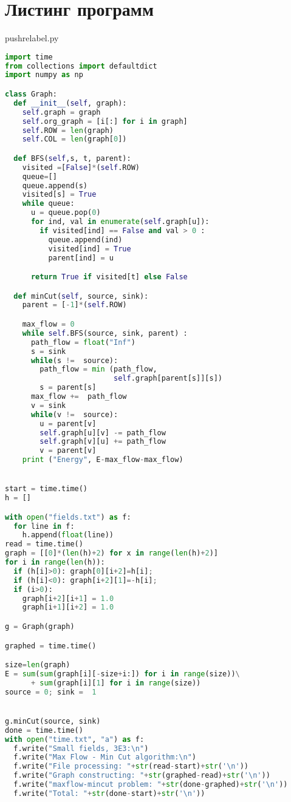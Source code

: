 \section*{Листинг программ}
pushrelabel.py
\begin{lstlisting}[language=Python]
import time
from collections import defaultdict
import numpy as np

class Graph:
  def __init__(self, graph):
    self.graph = graph
    self.org_graph = [i[:] for i in graph]
    self.ROW = len(graph)
    self.COL = len(graph[0])

  def BFS(self,s, t, parent):
    visited =[False]*(self.ROW)
    queue=[]
    queue.append(s)
    visited[s] = True
    while queue:
      u = queue.pop(0)
      for ind, val in enumerate(self.graph[u]):
        if visited[ind] == False and val > 0 :
          queue.append(ind)
          visited[ind] = True
          parent[ind] = u

      return True if visited[t] else False

  def minCut(self, source, sink):
    parent = [-1]*(self.ROW)

    max_flow = 0
    while self.BFS(source, sink, parent) :
      path_flow = float("Inf")
      s = sink
      while(s !=  source):
        path_flow = min (path_flow,
                         self.graph[parent[s]][s])
        s = parent[s]
      max_flow +=  path_flow
      v = sink
      while(v !=  source):
        u = parent[v]
        self.graph[u][v] -= path_flow
        self.graph[v][u] += path_flow
        v = parent[v]
    print ("Energy", E-max_flow-max_flow)


start = time.time()
h = []

with open("fields.txt") as f:
  for line in f:
    h.append(float(line))
read = time.time()
graph = [[0]*(len(h)+2) for x in range(len(h)+2)]
for i in range(len(h)):
  if (h[i]>0): graph[0][i+2]=h[i];
  if (h[i]<0): graph[i+2][1]=-h[i];
  if (i>0):
    graph[i+2][i+1] = 1.0
    graph[i+1][i+2] = 1.0

g = Graph(graph)

graphed = time.time()

size=len(graph)
E = sum(sum(graph[i][-size+i:]) for i in range(size))\
      + sum(graph[i][1] for i in range(size))
source = 0; sink =  1


g.minCut(source, sink)
done = time.time()
with open("time.txt", "a") as f:
  f.write("Small fields, 3E3:\n")
  f.write("Max Flow - Min Cut algorithm:\n")
  f.write("File processing: "+str(read-start)+str('\n'))
  f.write("Graph constructing: "+str(graphed-read)+str('\n'))
  f.write("maxflow-mincut problem: "+str(done-graphed)+str('\n'))
  f.write("Total: "+str(done-start)+str('\n'))
\end{lstlisting}
